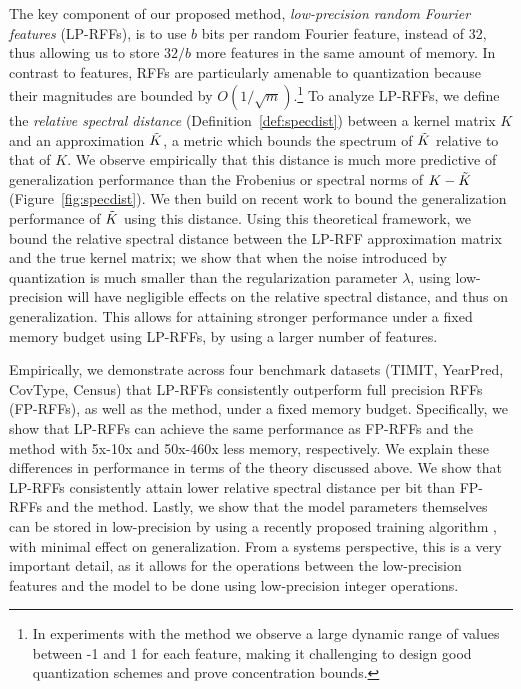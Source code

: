 The key component of our proposed method, \textit{low-precision random Fourier features} (LP-RFFs), is to use $b$ bits per random Fourier feature, instead of 32, thus allowing us to store $32/b$ more features in the same amount of memory. In contrast to \Nystrom features, RFFs are particularly amenable to quantization because their magnitudes are bounded by $O(1/\sqrt{m})$.\footnote{In experiments with the \Nystrom method we observe a large dynamic range of values between -1 and 1 for each \Nystrom feature, making it challenging to design good quantization schemes and prove concentration bounds.} To analyze LP-RFFs, we define the \textit{relative spectral distance} (Definition~\ref{def:specdist}) between a kernel matrix $K$ and an approximation $\tilde{K}$, a metric which bounds the spectrum of $\tilde{K}$ relative to that of $K$. We observe empirically that this distance is much more predictive of generalization performance than the Frobenius or spectral norms of $K-\tilde{K}$ (Figure~\ref{fig:specdist}). We then build on recent work \citep{avron17,musco17} to bound the generalization performance of $\tilde{K}$ using this distance. Using this theoretical framework, we bound the relative spectral distance between the LP-RFF approximation matrix and the true kernel matrix; we show that when the noise introduced by quantization is much smaller than the regularization parameter $\lambda$, using low-precision will have negligible effects on the relative spectral distance, and thus on generalization. This allows for attaining stronger performance under a fixed memory budget using LP-RFFs, by using a larger number of features.

Empirically, we demonstrate across four benchmark datasets (TIMIT, YearPred, CovType, Census) that LP-RFFs consistently outperform full precision RFFs (FP-RFFs), as well as the \Nystrom method, under a fixed memory budget. Specifically, we show that LP-RFFs can achieve the same performance as FP-RFFs and the \Nystrom method with 5x-10x and 50x-460x less memory, respectively. We explain these differences in performance in terms of the theory discussed above. We show that LP-RFFs consistently attain lower relative spectral distance per bit than FP-RFFs and the \Nystrom method. Lastly, we show that the model parameters themselves can be stored in low-precision by using a recently proposed training algorithm \citep{halp18}, with minimal effect on generalization. From a systems perspective, this is a very important detail, as it allows for the operations between the low-precision features and the model to be done using low-precision integer operations.

